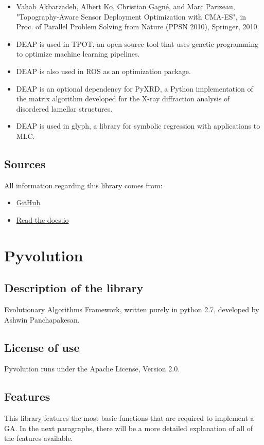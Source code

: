 \documentclass{article}
\begin{document}
\begin{itemize}
		\item  Vahab Akbarzadeh, Albert Ko, Christian Gagné, and Marc Parizeau, "Topography-Aware Sensor Deployment Optimization with CMA-ES", in Proc. of Parallel Problem Solving from Nature (PPSN 2010), Springer, 2010.
		\item   DEAP is used in TPOT, an open source tool that uses genetic programming to optimize machine learning pipelines.
		\item   DEAP is also used in ROS as an optimization package.
		\item     DEAP is an optional dependency for PyXRD, a Python implementation of the matrix algorithm developed for the X-ray diffraction analysis of disordered lamellar structures.
		\item  DEAP is used in glyph, a library for symbolic regression with applications to MLC.
		
	\end{itemize}
	\subsection{Sources}
	All information regarding this library comes from:
	\begin{itemize}
		\item \href{https://github.com/deap/deap}{GitHub}
		\item \href{https://deap.readthedocs.io/en/master/}{Read the docs.io}
	\end{itemize}
	
	\section{Pyvolution}
	
	\subsection{Description of the library}
	Evolutionary Algorithms Framework, written purely in python 2.7, developed by Ashwin Panchapakesan.
	\subsection{License of use}
	Pyvolution runs under the Apache License, Version 2.0.
	\subsection{Features}
	This library features the most basic functions that are required to implement a GA. In the next paragraphs, there will be a more detailed explanation of all of the features available. 
\end{document}
